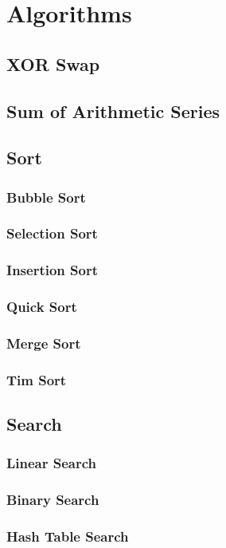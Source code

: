 \chapter{Algorithms}%
\section{XOR Swap}

\section{Sum of Arithmetic Series}

\section{Sort}
\subsection{Bubble Sort}

\subsection{Selection Sort}

\subsection{Insertion Sort}

\subsection{Quick Sort}

\subsection{Merge Sort}

\subsection{Tim Sort}

\section{Search}
\subsection{Linear Search}

\subsection{Binary Search}

\subsection{Hash Table Search}

